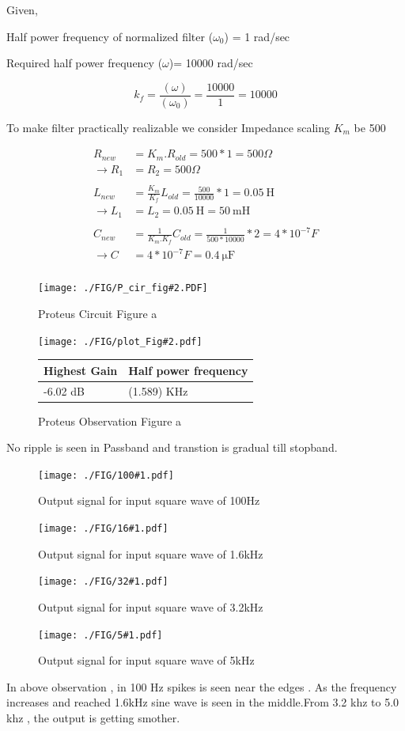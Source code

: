 \documentclass[a4paper,11pt]{article}
\newcommand{\Porcirobs}[4]{
    \begin{figure}[H] %
        \centering
        \texttt{[image: ./FIG/P\_cir\_fig\#2.PDF]}
        \caption{Proteus Circuit Figure #2}
    \end{figure}



    \begin{figure}[H]  %
        \centering
        \texttt{[image: ./FIG/plot\_Fig\#2.pdf]}
        \begin{tabular}[H]{| m{12em}| m{20em}|}
            \hline
            \rowcolor[rgb]{0.569,0.647,0.947} \textbf{Highest Gain } & \textbf{Half power frequency} \\ \hline
            #3 dB         & (#4) KHz     \\  \hline
        \end{tabular}
        \caption{Proteus Observation Figure #2}
    \end{figure}
}
\newcommand{\obsh}[1]{
 \begin{figure}[H]%
    \centering
    \texttt{[image: ./FIG/100\#1.pdf]}
    \caption{Output signal for input square wave of 100Hz}
\end{figure}
}
\newcommand{\obss}[1]{
\begin{figure}[H]%
    \centering
    \texttt{[image: ./FIG/16\#1.pdf]}
    \caption{Output signal for input square wave of 1.6kHz}
\end{figure}
}
\newcommand{\obst}[1]{
\begin{figure}[H]%
    \centering
    \texttt{[image: ./FIG/32\#1.pdf]}
    \caption{Output signal for input square wave of 3.2kHz}
\end{figure}
}
\newcommand{\obsf}[1]{
\begin{figure}[H]%
    \centering
    \texttt{[image: ./FIG/5\#1.pdf]}
    \caption{Output signal for input square wave of 5kHz}
\end{figure}
}
\begin{document}

Given,

Half power frequency of normalized filter ($\omega_0$) = 1 rad/sec

Required half power frequency ($\omega$)= 10000 rad/sec


\begin{equation*}
    k_f= \frac{(\omega)}{(\omega_0)} = \frac{10000}{1} = 10000
\end{equation*}

To make filter practically realizable we consider Impedance scaling $K_m$ be 500

\begin{align*}
    R_{new}         & =K_m.R_{old}=500 *1=  500 \Omega                                \\
    \rightarrow R_1 & =R_2=500 \Omega                                                 \\\\
    L_{new}         & =\frac{K_m}{K_f}L_{old}=\frac{500}{10000}*1=\SI {0.05} {\henry} \\
    \rightarrow L_1 & =L_2=\SI {0.05} {\henry}=\SI {50} {\milli\henry}                \\\\
    C_{new}         & =\frac{1}{K_m.K_f}C_{old}=\frac{1}{500*10000}*2=4*10^{-7} F     \\
    \rightarrow C   & =4*10^{-7}F=\SI{0.4}{\micro \farad}                             \\
\end{align*}



\Porcirobs{0.85}{a}{-6.02}{1.589}%

No ripple is seen in Passband and transtion is gradual till stopband.



\obsh{a}
\obss{a}
\obst{a}
\obsf{a}

In above observation , in 100 Hz spikes is seen near the edges . As the frequency increases and reached 1.6kHz sine wave is seen in the middle.From 3.2 khz to 5.0 khz , the output is  getting smother.

\end{document}
